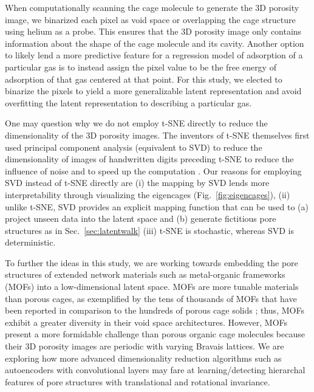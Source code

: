 \documentclass[journal=jacsat,manuscript=article,layout=traditional]{achemso}
\begin{document}
{\color{red} When computationally scanning the cage molecule to generate the 3D porosity image, we binarized each pixel as void space or overlapping the cage structure using helium as a probe. This ensures that the 3D porosity image only contains information about the shape of the cage molecule and its cavity. Another option to likely lend a more predictive feature for a regression model of adsorption of a particular gas is to instead assign the pixel value to be the free energy of adsorption of that gas centered at that point. For this study, we elected to binarize the pixels to yield a more generalizable latent representation and avoid overfitting the latent representation to describing a particular gas.}

{\color{red} One may question why we do not employ t-SNE \cite{maaten2008visualizing} directly to reduce the dimensionality of the 3D porosity images. The inventors of t-SNE themselves first used principal component analysis (equivalent to SVD) to reduce the dimensionality of images of handwritten digits preceding t-SNE to reduce the influence of noise and to speed up the computation \cite{maaten2008visualizing}. Our reasons for employing SVD instead of t-SNE directly are (i) the mapping by SVD lends more interpretability through visualizing the eigencages (Fig.~\ref{fig:eigencages}), (ii) unlike t-SNE, SVD provides an explicit mapping function that can be used to (a) project unseen data into the latent space and (b) generate fictitious pore structures as in Sec.~\ref{sec:latentwalk} (iii) t-SNE is stochastic, whereas SVD is deterministic. 
}

To further the ideas in this study, we are working towards embedding the pore structures of extended network materials such as metal-organic frameworks (MOFs) into a low-dimensional latent space. MOFs are more tunable materials than porous cages, as exemplified by the tens of thousands of MOFs that have been reported \cite{moghadam2017development} in comparison to the hundreds of porous cage solids \cite{evans2016computational}; thus, MOFs exhibit a greater diversity in their void space architectures. However, MOFs present a more formidable challenge than porous organic cage molecules because their 3D porosity images are periodic with varying Bravais lattices. We are exploring how more advanced dimensionality reduction algorithms such as autoencoders \cite{hinton2006reducing} with convolutional layers \cite{kavukcuoglu2010learning,zeiler2010deconvolutional} may fare at learning/detecting hierarchal features of pore structures with translational and rotational invariance.
\end{document}
